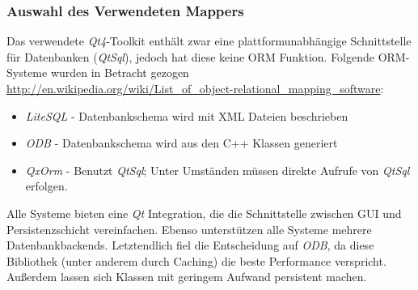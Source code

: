 \subsubsection{Auswahl des Verwendeten Mappers}
Das verwendete \textit{Qt4}-Toolkit enthält zwar eine plattformunabhängige Schnittstelle für Datenbanken (\textit{QtSql}), jedoch hat diese keine ORM Funktion.
Folgende ORM-Systeme wurden in Betracht gezogen\\
\url{http://en.wikipedia.org/wiki/List_of_object-relational_mapping_software}:
\begin{itemize}
	\item \textit{LiteSQL} - Datenbankschema wird mit XML Dateien beschrieben
	\item \textit{ODB} - Datenbankschema wird aus den C++ Klassen generiert
	\item \textit{QxOrm} - Benutzt \textit{QtSql}; Unter Umständen müssen direkte Aufrufe von \textit{QtSql} erfolgen. \cite{QxOrm_Tutorial}
\end{itemize}
Alle Systeme bieten eine \textit{Qt} Integration, die die Schnittstelle zwischen GUI und Persistenzschicht vereinfachen.
Ebenso unterstützen alle Systeme mehrere Datenbankbackends.
Letztendlich fiel die Entscheidung auf \textit{ODB}, da diese Bibliothek (unter anderem durch Caching) die beste Performance verspricht.
Außerdem lassen sich Klassen mit geringem Aufwand persistent machen.

\newpage

